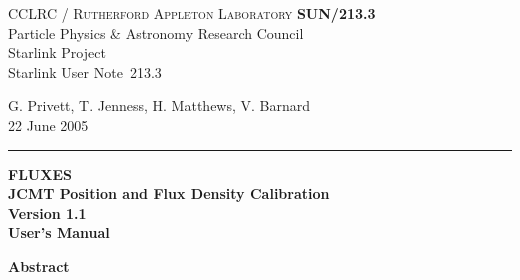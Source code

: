\documentclass[11pt,twoside]{article}
\newcommand{\stardoccategory}  {Starlink User Note}
\newcommand{\stardocinitials}  {SUN}
\newcommand{\stardocnumber}    {213.3}
\newcommand{\stardocauthors}   {G. Privett, T. Jenness, H. Matthews, V. Barnard}
\newcommand{\stardocdate}      {22 June 2005}
\newcommand{\stardoctitle}     {FLUXES\\[1ex]
                                JCMT Position and Flux Density Calibration}
\newcommand{\stardocversion}   {Version 1.1}
\newcommand{\stardocmanual}    {User's Manual}
\newcommand{\stardocname}{\stardocinitials /\stardocnumber}
\newenvironment{latexonly}{}{}
\renewcommand{\_}{\texttt{\symbol{95}}}
\begin{document}
\thispagestyle{empty}

\begin{latexonly}
   CCLRC / \textsc{Rutherford Appleton Laboratory} \hfill \textbf{\stardocname}\\
   {\large Particle Physics \& Astronomy Research Council}\\
   {\large Starlink Project\\}
   {\large \stardoccategory\ \stardocnumber}
   \begin{flushright}
   \stardocauthors\\
   \stardocdate
   \end{flushright}
   \vspace{-4mm}
   \rule{\textwidth}{0.5mm}
   \vspace{5mm}
   \begin{center}
   {\Huge\textbf{\stardoctitle \\ [2.5ex]}}
   {\LARGE\textbf{\stardocversion \\ [4ex]}}
   {\Huge\textbf{\stardocmanual}}
   \end{center}
   \vspace{5mm}


   \vspace{10mm}
   \begin{center}
      {\Large\textbf{Abstract}}
   \end{center}
\end{latexonly}
\end{document}
